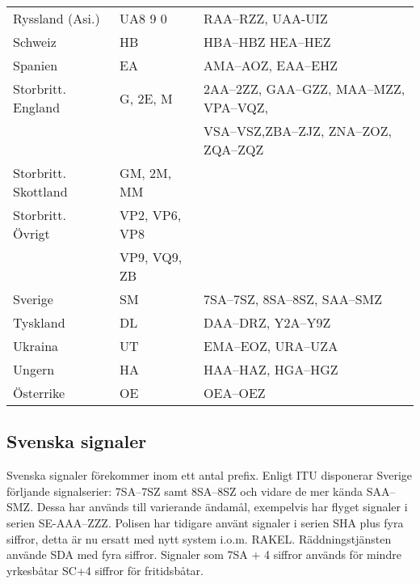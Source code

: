 \begin{center}
\begin{footnotesize}
\begin{longtable}{lll}
			Ryssland (Asi.)               & UA8 9 0        & RAA--RZZ, UAA-UIZ                                 \\
			Schweiz                       & HB             & HBA--HBZ HEA--HEZ                                 \\
			Spanien                       & EA             & AMA--AOZ, EAA--EHZ                                \\
			Storbritt. England            & G, 2E, M       & 2AA--2ZZ, GAA--GZZ, MAA--MZZ, VPA--VQZ,           \\
			                              &                & VSA--VSZ,ZBA--ZJZ, ZNA--ZOZ, ZQA--ZQZ             \\
			Storbritt. Skottland          & GM, 2M, MM     &                                                   \\
			Storbritt. Övrigt             & VP2, VP6, VP8  &                                                   \\
			                              & VP9, VQ9, ZB   &                                                   \\
			Sverige                       & SM             & 7SA--7SZ, 8SA--8SZ, SAA--SMZ                      \\
			Tyskland                      & DL             & DAA--DRZ, Y2A--Y9Z                                \\
			Ukraina                       & UT             & EMA--EOZ, URA--UZA                                \\
			Ungern                        & HA             & HAA--HAZ, HGA--HGZ                                \\
			Österrike                     & OE             & OEA--OEZ\\
		\end{longtable}
	\end{footnotesize}
\end{center}

\subsection{Svenska signaler}

Svenska signaler förekommer inom ett antal prefix. Enligt ITU disponerar Sverige
förljande signalserier: 7SA--7SZ samt 8SA--8SZ och vidare de mer kända SAA--SMZ.
Dessa har används till varierande ändamål, exempelvis har flyget signaler i
serien SE-AAA--ZZZ. Polisen har tidigare använt signaler i serien SHA plus fyra
siffror, detta är nu ersatt med nytt system i.o.m. RAKEL. Räddningstjänsten
använde SDA med fyra siffror. Signaler som 7SA + 4 siffror används för mindre
yrkesbåtar SC+4 siffror för fritidsbåtar.

